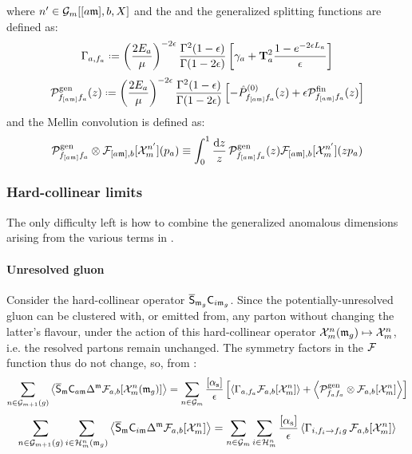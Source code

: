 where $ n' \in \mathcal{G}_m[[a\mathfrak{m}],b,X] $ and the  and the generalized splitting functions are defined as:
\begin{equation}
  \Gamma_{a , f_a} \defeq \left( \frac{2E_a}{\mu} \right)^{-2\de} \frac{\Gamma^2(1-\de)}{\Gamma(1-2\de)} \left[ \gamma_a + \tco^2_a \frac{1 - e^{-2\de L_a}}{\de} \right]
  \label{eq:in-gen-an-dim}
\end{equation}
\begin{equation}
  \gspl_{f_{[a\ur]} f_a}(z) \defeq \left( \frac{2E_a}{\mu} \right)^{-2\de} \frac{\Gamma^2(1-\de)}{\Gamma(1-2\de)} \left[ - \ap_{f_{[a\ur]} f_a}(z) + \de \fspl_{f_{[a\ur]} f_a}(z) \right]
\end{equation}
and the Mellin convolution is defined as:
\begin{equation}
  \mathcal{P}^\text{gen}_{f_{[a\mathfrak{m}]}f_a} \otimes \mathcal{F}_{[a\mathfrak{m}],b}[\mathcal{X}^{n'}_{m}](p_a) \equiv \int_0^1 \frac{\mathrm{d} z}{z}\, \mathcal{P}^\text{gen}_{f_{[a\mathfrak{m}]}f_a}(z) \mathcal{F}_{[a\mathfrak{m}],b}[\mathcal{X}^{n'}_{m}](z p_a)
\end{equation}

\subsubsection{Hard-collinear limits}

The only difficulty left is how to combine the generalized anomalous dimensions arising from the various terms in .

\paragraph{Unresolved gluon}

Consider the hard-collinear operator $ \overline{\mathsf{S}}_{\mathfrak{m}_g} \mathsf{C}_{i\mathfrak{m}_g} $. Since the potentially-unresolved gluon can be clustered with, or emitted from, any parton without changing the latter's flavour, under the action of this hard-collinear operator $ \mathcal{X}^{n}_{m}(\mathfrak{m}_g) \mapsto \mathcal{X}^{n}_{m} $, i.e. the resolved partons remain unchanged. The symmetry factors in the $ \mathcal{F} $ function thus do not change, so, from :
\begin{equation}
  \sum_{n \in \mathcal{G}_{m+1}(g)} \left\langle \overline{\mathsf{S}}_{\mathfrak{m}} \mathsf{C}_{a\mathfrak{m}} \Delta^{\mathfrak{m}} \mathcal{F}_{a,b}[\mathcal{X}^{n}_{m}(\mathfrak{m}_g)] \right\rangle = \sum_{n \in \mathcal{G}_m} \frac{[\alpha_\text{s}]}{\epsilon} \left[ \left\langle \Gamma_{a,f_a} \mathcal{F}_{a,b}[\mathcal{X}^{n}_{m}] \right\rangle + \left\langle \mathcal{P}^\text{gen}_{f_a f_a} \otimes \mathcal{F}_{a,b}[\mathcal{X}^{n}_{m}] \right\rangle \right]
\end{equation}
\begin{equation}
  \sum_{n \in \mathcal{G}_{m+1}(g)} \sum_{i \in \mathcal{H}^{n}_{m}(\mathfrak{m}_g)} \left\langle \overline{\mathsf{S}}_{\mathfrak{m}} \mathsf{C}_{i\mathfrak{m}} \Delta^{\mathfrak{m}} \mathcal{F}_{a,b}[\mathcal{X}^{n}_{m}] \right\rangle = \sum_{n \in \mathcal{G}_m} \sum_{i \in \mathcal{H}^{n}_{m}} \frac{[\alpha_\text{s}]}{\epsilon} \left\langle \Gamma_{i, f_i \rightarrow f_i g} \,\mathcal{F}_{a,b}[\mathcal{X}^{n}_{m}] \right\rangle
\end{equation}

